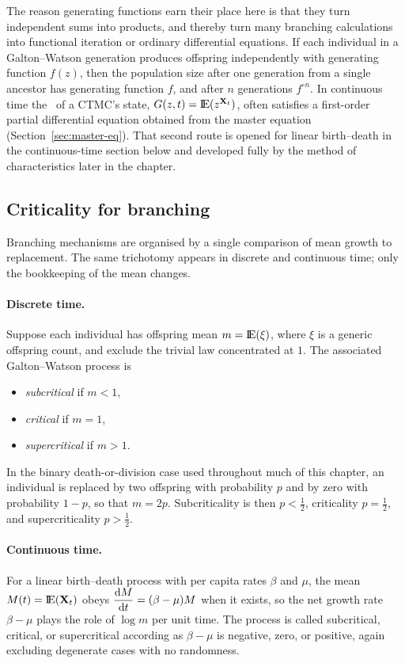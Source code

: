 The reason generating functions earn their place here is that they turn independent sums into products, and thereby turn many branching calculations into functional iteration or ordinary differential equations. If each individual in a Galton--Watson generation produces offspring independently with generating function $f(z)$, then the population size after one generation from a single ancestor has generating function $f$, and after $n$ generations $f^{\circ n}$. In continuous time the \pgf\ of a CTMC's state, $G(z,t)={\rm I}\!{\rm E}(z^{{{\bf X}_t}})$, often satisfies a first-order partial differential equation obtained from the master equation (Section~\ref{sec:master-eq}). That second route is opened for linear birth--death in the continuous-time section below and developed fully by the method of characteristics later in the chapter.

\subsection{Criticality for branching}
\label{sec:criticality}

Branching mechanisms are organised by a single comparison of mean growth to replacement. The same trichotomy appears in discrete and continuous time; only the bookkeeping of the mean changes.

\paragraph{Discrete time.}
Suppose each individual has offspring mean $m={\rm I}\!{\rm E}(\xi)$, where $\xi$ is a generic offspring count, and exclude the trivial law concentrated at $1$. The associated Galton--Watson process is
\begin{itemize}
\item \emph{subcritical} if $m<1$,
\item \emph{critical} if $m=1$,
\item \emph{supercritical} if $m>1$.
\end{itemize}
In the binary death-or-division case used throughout much of this chapter, an individual is replaced by two offspring with probability $p$ and by zero with probability $1-p$, so that $m=2p$. Subcriticality is then $p<\tfrac12$, criticality $p=\tfrac12$, and supercriticality $p>\tfrac12$.

\paragraph{Continuous time.}
For a linear birth--death process with per capita rates $\beta$ and $\mu$, the mean $M(t)={\rm I}\!{\rm E}({{\bf X}_t})$ obeys $\displaystyle\frac{{\rm d} M}{{\rm d} t}=(\beta-\mu)M$ when it exists, so the net growth rate $\beta-\mu$ plays the role of $\log m$ per unit time. The process is called subcritical, critical, or supercritical according as $\beta-\mu$ is negative, zero, or positive, again excluding degenerate cases with no randomness.


